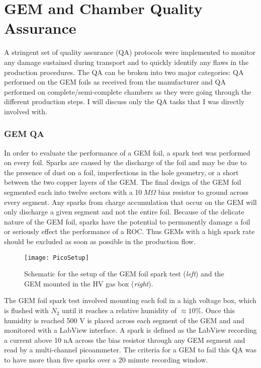 \section{GEM and Chamber Quality Assurance}

A stringent set of quality assurance (QA)\cite{Brucken:2018rej}\cite{Brucken:2017qjy} protocols were implemented to monitor any damage sustained during transport and to quickly identify any flaws in the production procedures.  The QA can be broken into two major categories: QA performed on the GEM foils as received from the manufacturer and QA performed on complete/semi-complete chambers as they were going through the different production steps.  I will discuss only the QA tasks that I was directly involved with.

\subsubsection{GEM QA}

In order to evaluate the performance of a GEM foil, a spark test was performed on every foil.  Sparks are caused by the discharge of the foil and may be due to the presence of dust on a foil, imperfections in the hole geometry, or a short between the two copper layers of the GEM.  The final design of the GEM foil segmented each into twelve sectors with a 10$\: M \Omega$ bias resistor to ground across every segment.  Any sparks from charge accumulation that occur on the GEM will only discharge a given segment and not the entire foil.  Because of the delicate nature of the GEM foil, sparks have the potential to permanently damage a foil or seriously effect the performance of a ROC.  Thus GEMs with a high spark rate should be excluded as soon as possible in the production flow.

\begin{figure}[h]
\texttt{[image: PicoSetup]}
\centering
\caption{Schematic for the setup of the GEM foil spark test (\textit{left})\cite{Brucken:2018rej} and the GEM mounted in the HV gas box (\textit{right}). }
\label{fig:PicoSetup}
\end{figure}

\noindent
The GEM foil spark test involved mounting each foil in a high voltage box, which is flushed with $N_{2}$ until it reaches a relative humidity of $\approx 10\%$.  Once this humidity is reached 500 V is placed across each segment of the GEM and and monitored with a LabView interface.  A spark is defined as the LabView recording a current above 10 nA across the bias resistor through any GEM segment and read by a multi-channel picoammeter.  The criteria for a GEM to fail this QA was to have more than five sparks over a 20 minute recording window.

